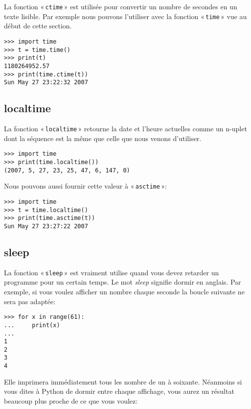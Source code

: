 La fonction « \texttt{ctime} » est utilisée pour convertir un nombre de secondes en un texte lisible.  Par exemple nous pouvons l'utiliser avec la fonction « \texttt{time} » vue au début de cette section.

\begin{Verbatim}[frame=single,rulecolor=\color{gray}]
>>> import time
>>> t = time.time()
>>> print(t)
1180264952.57
>>> print(time.ctime(t))
Sun May 27 23:22:32 2007
\end{Verbatim}


\subsection{localtime}

La fonction « \texttt{localtime} » retourne la date et l'heure actuelles comme un n-uplet dont la séquence est la même que celle que nous venons d'utiliser. 

\begin{Verbatim}[frame=single,rulecolor=\color{gray}]
>>> import time
>>> print(time.localtime())
(2007, 5, 27, 23, 25, 47, 6, 147, 0)
\end{Verbatim}


Nous pouvons aussi fournir cette valeur à « \texttt{asctime} »:

\begin{Verbatim}[frame=single,rulecolor=\color{gray}]
>>> import time
>>> t = time.localtime()
>>> print(time.asctime(t))
Sun May 27 23:27:22 2007
\end{Verbatim}

\subsection{sleep}

La fonction « \texttt{sleep} » est vraiment utilise quand vous devez retarder un programme pour un certain temps. Le mot \emph{sleep} signifie dormir en anglais. Par exemple, si vous voulez afficher un nombre chaque seconde la boucle suivante ne sera pas adaptée:

\begin{Verbatim}[frame=single,rulecolor=\color{gray}]
>>> for x in range(61):
...     print(x)
...
1
2
3
4
\end{Verbatim}

Elle imprimera immédiatement tous les nombre de un à soixante. Néanmoins si vous dites à Python de dormir entre chaque affichage, vous aurez un résultat beaucoup plus proche de ce que vous voulez:

